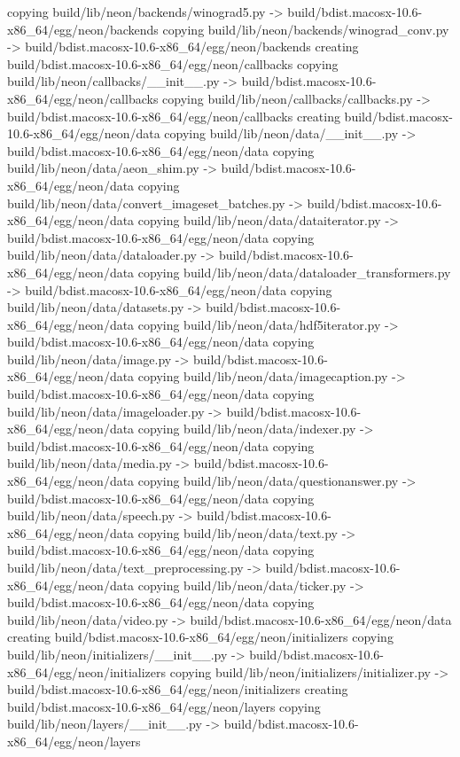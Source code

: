 copying build/lib/neon/backends/winograd5.py -> build/bdist.macosx-10.6-x86_64/egg/neon/backends
copying build/lib/neon/backends/winograd_conv.py -> build/bdist.macosx-10.6-x86_64/egg/neon/backends
creating build/bdist.macosx-10.6-x86_64/egg/neon/callbacks
copying build/lib/neon/callbacks/__init__.py -> build/bdist.macosx-10.6-x86_64/egg/neon/callbacks
copying build/lib/neon/callbacks/callbacks.py -> build/bdist.macosx-10.6-x86_64/egg/neon/callbacks
creating build/bdist.macosx-10.6-x86_64/egg/neon/data
copying build/lib/neon/data/__init__.py -> build/bdist.macosx-10.6-x86_64/egg/neon/data
copying build/lib/neon/data/aeon_shim.py -> build/bdist.macosx-10.6-x86_64/egg/neon/data
copying build/lib/neon/data/convert_imageset_batches.py -> build/bdist.macosx-10.6-x86_64/egg/neon/data
copying build/lib/neon/data/dataiterator.py -> build/bdist.macosx-10.6-x86_64/egg/neon/data
copying build/lib/neon/data/dataloader.py -> build/bdist.macosx-10.6-x86_64/egg/neon/data
copying build/lib/neon/data/dataloader_transformers.py -> build/bdist.macosx-10.6-x86_64/egg/neon/data
copying build/lib/neon/data/datasets.py -> build/bdist.macosx-10.6-x86_64/egg/neon/data
copying build/lib/neon/data/hdf5iterator.py -> build/bdist.macosx-10.6-x86_64/egg/neon/data
copying build/lib/neon/data/image.py -> build/bdist.macosx-10.6-x86_64/egg/neon/data
copying build/lib/neon/data/imagecaption.py -> build/bdist.macosx-10.6-x86_64/egg/neon/data
copying build/lib/neon/data/imageloader.py -> build/bdist.macosx-10.6-x86_64/egg/neon/data
copying build/lib/neon/data/indexer.py -> build/bdist.macosx-10.6-x86_64/egg/neon/data
copying build/lib/neon/data/media.py -> build/bdist.macosx-10.6-x86_64/egg/neon/data
copying build/lib/neon/data/questionanswer.py -> build/bdist.macosx-10.6-x86_64/egg/neon/data
copying build/lib/neon/data/speech.py -> build/bdist.macosx-10.6-x86_64/egg/neon/data
copying build/lib/neon/data/text.py -> build/bdist.macosx-10.6-x86_64/egg/neon/data
copying build/lib/neon/data/text_preprocessing.py -> build/bdist.macosx-10.6-x86_64/egg/neon/data
copying build/lib/neon/data/ticker.py -> build/bdist.macosx-10.6-x86_64/egg/neon/data
copying build/lib/neon/data/video.py -> build/bdist.macosx-10.6-x86_64/egg/neon/data
creating build/bdist.macosx-10.6-x86_64/egg/neon/initializers
copying build/lib/neon/initializers/__init__.py -> build/bdist.macosx-10.6-x86_64/egg/neon/initializers
copying build/lib/neon/initializers/initializer.py -> build/bdist.macosx-10.6-x86_64/egg/neon/initializers
creating build/bdist.macosx-10.6-x86_64/egg/neon/layers
copying build/lib/neon/layers/__init__.py -> build/bdist.macosx-10.6-x86_64/egg/neon/layers
